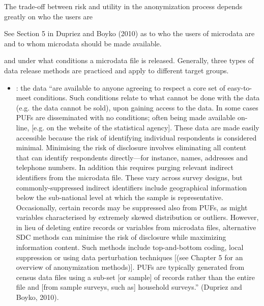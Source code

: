 \documentclass[letterpaper,10pt,english]{sphinxmanual}
\begin{document}
The trade-off between risk and utility in the anonymization process
depends greatly on who the users are %
\begin{footnote}[1]\sphinxAtStartFootnote
See Section 5 in Dupriez and Boyko (2010) as to who the users of
microdata are and to whom microdata should be made available.
%
\end{footnote} and under
what conditions a microdata file is released. Generally, three types of
data release methods are practiced and apply to different target groups.
\begin{itemize}
\item {} 
: the data “are available to anyone agreeing
to respect a core set of easy-to-meet conditions. Such conditions
relate to what cannot be done with the data (e.g. the data cannot be
sold), upon gaining access to the data. In some cases PUFs are
disseminated with no conditions; often being made available on-line,
{[}e.g. on the website of the statistical agency{]}. These data are made
easily accessible because the risk of identifying individual
respondents is considered minimal. Minimising the risk of disclosure
involves eliminating all content that can identify respondents
directly—for instance, names, addresses and telephone numbers. In
addition this requires purging relevant indirect identifiers from the
microdata file. These vary across survey designs, but
commonly-suppressed indirect identifiers include geographical
information below the sub-national level at which the sample is
representative. Occasionally, certain records may be suppressed also
from PUFs, as might variables characterised by extremely skewed
distribution or outliers. However, in lieu of deleting entire records
or variables from microdata files, alternative SDC methods can
minimise the risk of disclosure while maximizing information content.
Such methods include top-and-bottom coding, local suppression or
using data perturbation techniques {[}(see Chapter 5 for an overview of
anonymization methods){]}. PUFs are typically generated from census
data files using a sub-set {[}or sample{]} of records rather than the
entire file and {[}from sample surveys, such as{]} household surveys.”
(Dupriez and Boyko, 2010).


\end{itemize}
\end{document}
